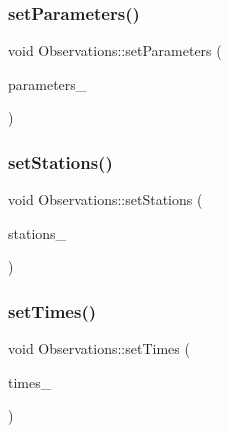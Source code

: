 \mbox{\label{class_observations_a6965bc35582ce23ed840e9e6bf1fa228}} 
\subsubsection{\texorpdfstring{set\+Parameters()}{setParameters()}}
{\footnotesize\ttfamily void Observations\+::set\+Parameters (\begin{DoxyParamCaption}\item[{\mbox{\hyperlink{classanen_par_1_1_parameters}{anen\+Par\+::\+Parameters}}}]{parameters\+\_\+ }\end{DoxyParamCaption})}

\mbox{\label{class_observations_a01ddf7eb5d0b9c3fec31731a931cfdf4}} 
\subsubsection{\texorpdfstring{set\+Stations()}{setStations()}}
{\footnotesize\ttfamily void Observations\+::set\+Stations (\begin{DoxyParamCaption}\item[{\mbox{\hyperlink{classanen_sta_1_1_stations}{anen\+Sta\+::\+Stations}}}]{stations\+\_\+ }\end{DoxyParamCaption})}

\mbox{\label{class_observations_a28c65d41c60cb95607e06d090d03a8d2}} 
\subsubsection{\texorpdfstring{set\+Times()}{setTimes()}}
{\footnotesize\ttfamily void Observations\+::set\+Times (\begin{DoxyParamCaption}\item[{\mbox{\hyperlink{classanen_time_1_1_times}{anen\+Time\+::\+Times}}}]{times\+\_\+ }\end{DoxyParamCaption})}

\mbox{\label{class_observations_a6f00b4a2277ce9e77cd0d5975f4066f8}} 
